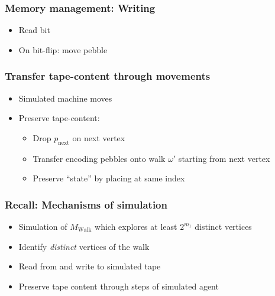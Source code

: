 \documentclass{beamer}
\begin{document}
\begin{frame}
  \frametitle{Memory management: Writing}
  \begin{itemize}
    \item Read bit
    \item On bit-flip: move pebble
  \end{itemize}
  \resizebox{\textwidth}{!}{}
\end{frame}

\begin{frame}
  \frametitle{Transfer tape-content through movements}
  \begin{itemize}
    \item Simulated machine moves
    \item Preserve tape-content:
      \begin{itemize}
        \item Drop $p_{\text{next}}$ on next vertex
        \item Transfer encoding pebbles onto walk $\omega'$ starting from
          next vertex
        \item Preserve \enquote{state} by placing at same index
      \end{itemize}
  \end{itemize}
\end{frame}

\begin{frame}
  \frametitle{Recall: Mechanisms of simulation}
  \begin{itemize}
    \item Simulation of $M_{\text{Walk}}$ which explores at least $2^{m_{1}}$
      distinct vertices 
    \item Identify \emph{distinct} vertices of the walk 
    \item Read from and write to simulated tape 
    \item Preserve tape content through steps of simulated agent 
  \end{itemize}
\end{frame}
\end{document}
